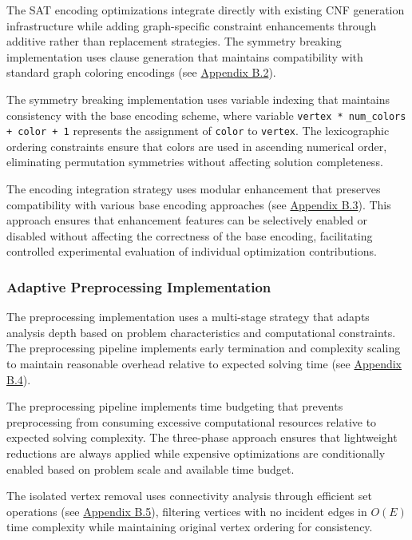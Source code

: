 The SAT encoding optimizations integrate directly with existing CNF generation infrastructure while adding graph-specific constraint enhancements through additive rather than replacement strategies. The symmetry breaking implementation uses clause generation that maintains compatibility with standard graph coloring encodings (see \hyperref[appendix:symmetry-breaking]{Appendix B.2}).

The symmetry breaking implementation uses variable indexing that maintains consistency with the base encoding scheme, where variable \texttt{vertex * num\_colors + color + 1} represents the assignment of \texttt{color} to \texttt{vertex}. The lexicographic ordering constraints ensure that colors are used in ascending numerical order, eliminating permutation symmetries without affecting solution completeness.

The encoding integration strategy uses modular enhancement that preserves compatibility with various base encoding approaches (see \hyperref[appendix:encoding-integration]{Appendix B.3}). This approach ensures that enhancement features can be selectively enabled or disabled without affecting the correctness of the base encoding, facilitating controlled experimental evaluation of individual optimization contributions.

\subsubsection{Adaptive Preprocessing Implementation}

The preprocessing implementation uses a multi-stage strategy that adapts analysis depth based on problem characteristics and computational constraints. The preprocessing pipeline implements early termination and complexity scaling to maintain reasonable overhead relative to expected solving time (see \hyperref[appendix:adaptive-preprocessing]{Appendix B.4}).

The preprocessing pipeline implements time budgeting that prevents preprocessing from consuming excessive computational resources relative to expected solving complexity. The three-phase approach ensures that lightweight reductions are always applied while expensive optimizations are conditionally enabled based on problem scale and available time budget.

The isolated vertex removal uses connectivity analysis through efficient set operations (see \hyperref[appendix:vertex-filtering]{Appendix B.5}), filtering vertices with no incident edges in $O(E)$ time complexity while maintaining original vertex ordering for consistency.

